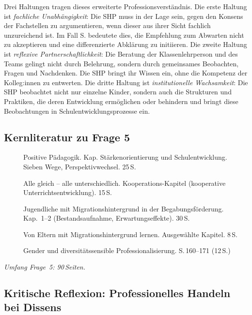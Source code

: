 \documentclass[ngerman, a4paper]{article}
\begin{document}
Drei Haltungen tragen dieses erweiterte Professionsverständnis. Die erste
Haltung ist \textit{fachliche Unabhängigkeit}: Die SHP muss in der Lage sein,
gegen den Konsens der Fachstellen zu argumentieren, wenn dieser aus ihrer Sicht
fachlich unzureichend ist. Im Fall S. bedeutete dies, die Empfehlung zum
Abwarten nicht zu akzeptieren und eine differenzierte Abklärung zu initiieren.
Die zweite Haltung ist \textit{reflexive Partnerschaftlichkeit}: Die Beratung
der Klassenlehrperson und des Teams gelingt nicht durch Belehrung, sondern
durch gemeinsames Beobachten, Fragen und Nachdenken. Die SHP bringt ihr Wissen
ein, ohne die Kompetenz der Kolleg:innen zu entwerten. Die dritte Haltung ist
\textit{institutionelle Wachsamkeit}: Die SHP beobachtet nicht nur einzelne
Kinder, sondern auch die Strukturen und Praktiken, die deren Entwicklung
ermöglichen oder behindern und bringt diese Beobachtungen in
Schulentwicklungsprozesse ein.

\subsection{Kernliteratur zu Frage 5}
 
\begin{description}
  \item[\cite{burow2021positive}] Positive Pädagogik. Kap. Stärkenorientierung
    und Schulentwicklung. Sieben Wege, Perspektivwechsel. 25\,S.
  \item[\cite{buholzer2010allegleich}] Alle gleich -- alle unterschiedlich.
    Kooperations-Kapitel (kooperative Unterrichtsentwicklung). 15\,S.
  \item[\cite{leikhof2021jugendliche}] Jugendliche mit Migrationshintergrund
    in der Begabungsförderung. Kap.~1--2 (Bestandsaufnahme,
    Erwartungseffekte). 30\,S.
  \item[\cite{kosoroklabhart2021voneltern}] Von Eltern mit
    Migrationshintergrund lernen. Ausgewählte Kapitel. 8\,S.
  \item[\cite{macha2019gender}] Gender und diversitätssensible
    Professionalisierung. S.\,160--171 (12\,S.)
\end{description}
 
\textit{Umfang Frage~5: 90\,Seiten.}
 

 


\subsection{Kritische Reflexion: Professionelles Handeln bei Dissens}
\end{document}
